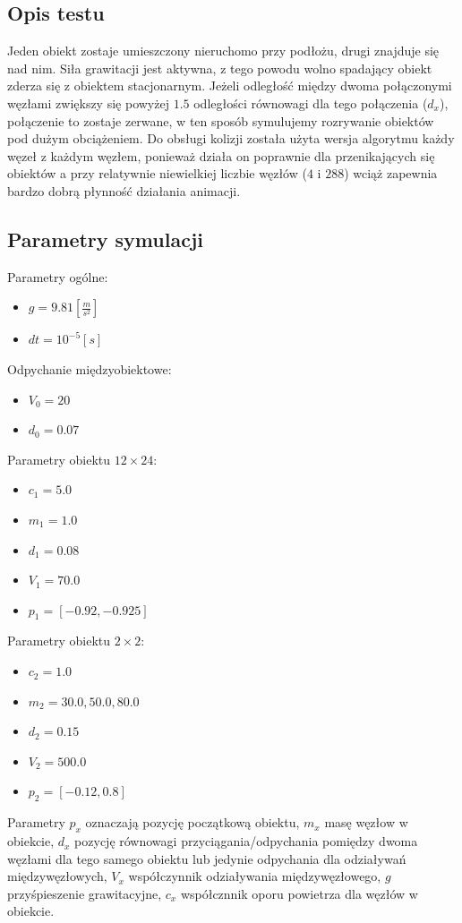 \documentclass[12pt, letterpaper]{report}
\begin{document}
    \subsection{Opis testu}
    Jeden obiekt zostaje umieszczony nieruchomo przy podłożu, drugi znajduje się nad nim. Siła grawitacji
    jest aktywna, z tego powodu wolno spadający obiekt zderza się z obiektem stacjonarnym.
    Jeżeli odległość między dwoma połączonymi węzłami zwiększy się powyżej $1.5$ odległości równowagi dla 
    tego połączenia ($d_x$), połączenie to zostaje zerwane, w ten sposób symulujemy rozrywanie obiektów pod dużym 
    obciążeniem. Do obsługi kolizji została użyta wersja algorytmu każdy węzeł z każdym węzłem, ponieważ
    działa on poprawnie dla przenikających się obiektów a przy relatywnie niewielkiej liczbie 
    węzłów ($4$ i $288$) wciąż zapewnia bardzo dobrą płynność działania animacji.

        
    \subsection{Parametry symulacji}
    Parametry ogólne:
    \begin{itemize}
        \item $g = 9.81 [\frac{m}{s^2}]$
        \item $dt = 10^{-5}[s]$
    \end{itemize}
    Odpychanie międzyobiektowe:
    \begin{itemize}
        \item $V_{0} = 20$
        \item $d_{0} = 0.07$
    \end{itemize}
    Parametry obiektu $12 \times 24$:
    \begin{itemize}
        \item $c_{1} = 5.0$
        \item $m_{1} = 1.0$
        \item $d_{1} = 0.08$
        \item $V_{1} = 70.0$
        \item $p_{1} = [-0.92, -0.925]$
    \end{itemize}
    Parametry obiektu $2 \times 2$:
    \begin{itemize}
        \item $c_{2} = 1.0$
        \item $m_{2} = 30.0, 50.0, 80.0$
        \item $d_{2} = 0.15$
        \item $V_{2} = 500.0$
        \item $p_{2} = [-0.12, 0.8]$
    \end{itemize}
    Parametry $p_x$ oznaczają pozycję początkową obiektu, $m_x$ masę węzłow w obiekcie, 
    $d_x$ pozycję równowagi przyciągania/odpychania pomiędzy dwoma węzłami dla tego
    samego obiektu lub jedynie odpychania dla odziaływań międzywęzłowych,
    $V_x$ współczynnik odziaływania międzywęzłowego, $g$ przyśpieszenie grawitacyjne, 
    $c_x$ współcznnik oporu powietrza dla węzłów w obiekcie.
\end{document}
